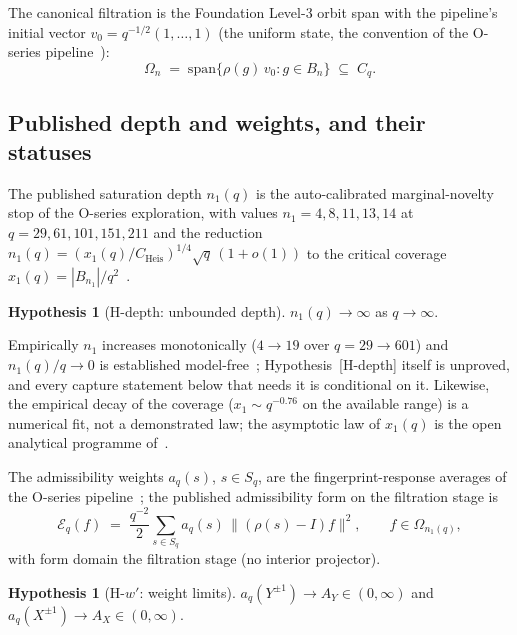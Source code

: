 \documentclass[11pt,a4paper]{article}
\theoremstyle{plain}
\theoremstyle{definition}
\newtheorem{hypothesis}[theorem]{Hypothesis}
\theoremstyle{remark}
\newcommand{\Cq}{C_q}
\newcommand{\Eq}{\mathcal{E}_q}
\newcommand{\CHeis}{C_{\mathrm{Heis}}}
\begin{document}
    The canonical filtration is the Foundation Level-3 orbit span with the pipeline's initial vector
    $v_0 = q^{-1/2}(1, \ldots, 1)$ (the uniform state, the convention of the O-series
    pipeline~\cite{Beau2026a16}):
    \begin{equation}
      \label{eq:filtration}
      \Omega_n \;=\; \mathrm{span}\{\rho(g)\, v_0 : g \in B_n\} \;\subseteq\; \Cq .
    \end{equation}

  \subsection{Published depth and weights, and their statuses}

    The published saturation depth $n_1(q)$ is the auto-calibrated marginal-novelty stop of the
    O-series exploration, with values $n_1 = 4, 8, 11, 13, 14$ at $q = 29, 61, 101, 151, 211$ and the
    reduction $n_1(q) = (x_1(q)/\CHeis)^{1/4}\sqrt{q}\,(1 + o(1))$ to the critical coverage
    $x_1(q) = |B_{n_1}|/q^2$~\cite{Beau2026a32,Beau2026ccnote}.

    \begin{hypothesis}[H-depth: unbounded depth]
      \label{hyp:depth}
      $n_1(q) \to \infty$ as $q \to \infty$.
    \end{hypothesis}

    Empirically $n_1$ increases monotonically ($4 \to 19$ over $q = 29 \to 601$) and
    $n_1(q)/q \to 0$ is established model-free~\cite{Beau2026a32}; Hypothesis~[H-depth] itself is
    unproved, and every capture statement below that needs it is conditional on it.
    Likewise, the empirical decay of the coverage ($x_1 \sim q^{-0.76}$ on the available range) is a
    numerical fit, not a demonstrated law; the asymptotic law of $x_1(q)$ is the open analytical
    programme of~\cite{Beau2026ccnote}.

    The admissibility weights $a_q(s)$, $s \in S_q$, are the fingerprint-response averages of the
    O-series pipeline~\cite{Beau2026a16,Beau2026a29}; the published admissibility form on the
    filtration stage is
    \begin{equation}
      \label{eq:form}
      \Eq(f) \;=\; \frac{q^{-2}}{2} \sum_{s \in S_q} a_q(s)\, \bigl\| (\rho(s) - I) f \bigr\|^2,
      \qquad f \in \Omega_{n_1(q)} ,
    \end{equation}
    with form domain the filtration stage (no interior projector).

    \begin{hypothesis}[H-$w'$: weight limits]
      \label{hyp:weights}
      $a_q(Y^{\pm1}) \to A_Y \in (0, \infty)$ and $a_q(X^{\pm1}) \to A_X \in (0, \infty)$.
    \end{hypothesis}
\end{document}
